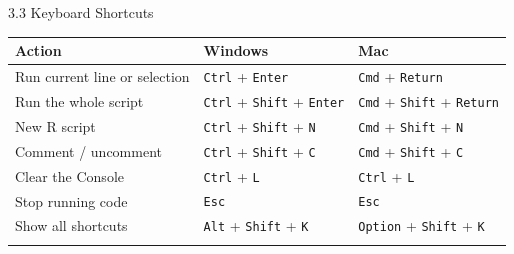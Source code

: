 \documentclass[
  ignorenonframetext,
  aspectratio=169,
]{beamer}
\newcounter{none} %
\begin{document}
\begin{frame}[fragile]{3.3 Keyboard Shortcuts}
\protect{}\label{keyboard-shortcuts}
{\def\LTcaptype{none} %
\begin{longtable}[]{@{}
  >{\raggedright\arraybackslash}p{}
  >{\raggedright\arraybackslash}p{}
  >{\raggedright\arraybackslash}p{}@{}}
\toprule\noalign{}
\begin{minipage}[b]{\linewidth}\raggedright
Action
\end{minipage} & \begin{minipage}[b]{\linewidth}\raggedright
Windows
\end{minipage} & \begin{minipage}[b]{\linewidth}\raggedright
Mac
\end{minipage} \\
\midrule\noalign{}
\endhead
Run current line or selection & \texttt{Ctrl} + \texttt{Enter} &
\texttt{Cmd} + \texttt{Return} \\
Run the whole script & \texttt{Ctrl} + \texttt{Shift} + \texttt{Enter} &
\texttt{Cmd} + \texttt{Shift} + \texttt{Return} \\
New R script & \texttt{Ctrl} + \texttt{Shift} + \texttt{N} &
\texttt{Cmd} + \texttt{Shift} + \texttt{N} \\
Comment / uncomment & \texttt{Ctrl} + \texttt{Shift} + \texttt{C} &
\texttt{Cmd} + \texttt{Shift} + \texttt{C} \\
Clear the Console & \texttt{Ctrl} + \texttt{L} & \texttt{Ctrl} +
\texttt{L} \\
Stop running code & \texttt{Esc} & \texttt{Esc} \\
Show all shortcuts & \texttt{Alt} + \texttt{Shift} + \texttt{K} &
\texttt{Option} + \texttt{Shift} + \texttt{K} \\
\bottomrule\noalign{}
\end{longtable}
}
\end{frame}
\end{document}
